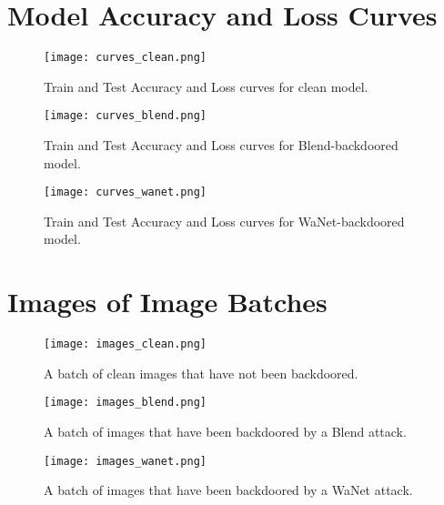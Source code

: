 \documentclass{article}
\begin{document}
\appendix
\pagebreak
\section{Model Accuracy and Loss Curves}
\label{sec:model_accuracy_and_loss_curves}

\begin{figure}[h!]
    \centering
    \texttt{[image: curves\_clean.png]}
    \caption{Train and Test Accuracy and Loss curves for clean model.}
\end{figure}
\begin{figure}[h!]
    \centering
    \texttt{[image: curves\_blend.png]}
    \caption{Train and Test Accuracy and Loss curves for Blend-backdoored model.}
\end{figure}
\begin{figure}[h!]
    \centering
    \texttt{[image: curves\_wanet.png]}
    \caption{Train and Test Accuracy and Loss curves for WaNet-backdoored model.}
\end{figure}

\pagebreak
\section{Images of Image Batches}
\label{sec:images_of_image_batches}

\begin{figure}[h!]
    \centering
    \texttt{[image: images\_clean.png]}
    \caption{A batch of clean images that have not been backdoored.}
\end{figure}
\begin{figure}[h!]
    \centering
    \texttt{[image: images\_blend.png]}
    \caption{A batch of images that have been backdoored by a Blend attack.}
\end{figure}
\begin{figure}[h!]
    \centering
    \texttt{[image: images\_wanet.png]}
    \caption{A batch of images that have been backdoored by a WaNet attack.}
\end{figure}
\end{document}
